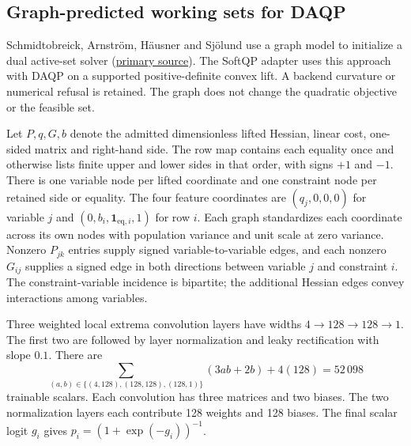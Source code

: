 \subsection{Graph-predicted working sets for DAQP}\label{sec:method-learned-daqp}
Schmidtobreick, Arnstr\"om, H\"ausner and Sj\"olund use a graph model
to initialize a dual active-set solver
(\href{https://arxiv.org/abs/2511.13174v2}{primary source}).
The SoftQP adapter uses this approach with DAQP \cite{daqp} on a
supported positive-definite convex lift. A backend curvature or
numerical refusal is retained. The graph does not change the quadratic
objective or the feasible set.

Let \(P,q,G,b\) denote the admitted dimensionless lifted Hessian,
linear cost, one-sided matrix and right-hand side. The row map
contains each equality once and otherwise lists finite upper and
lower sides in that order, with signs \(+1\) and \(-1\). There is
one variable node per lifted coordinate and one constraint node per
retained side or equality. The four feature coordinates are
\((q_j,0,0,0)\) for variable \(j\) and
\((0,b_i,\mathbf1_{\mathrm{eq},i},1)\) for row \(i\).
Each graph standardizes each coordinate across its own nodes with
population variance and unit scale at zero variance. Nonzero
\(P_{jk}\) entries supply signed variable-to-variable edges, and
each nonzero \(G_{ij}\) supplies a signed edge in both directions
between variable \(j\) and constraint \(i\). The constraint-variable
incidence is bipartite; the additional Hessian edges convey
interactions among variables.

Three weighted local extrema convolution layers have widths
\(4\to128\to128\to1\). The first two are followed by layer normalization
and leaky rectification with slope \(0.1\). There are
\begin{equation}\label{eq:learn-daqp-parameters}
 \sum_{(a,b)\in\{(4,128),(128,128),(128,1)\}}(3ab+2b)+4(128)
 =52\,098
\end{equation}
trainable scalars. Each convolution has three matrices and two
biases. The two normalization layers each contribute 128 weights
and 128 biases. The final scalar logit \(g_i\) gives
\(p_i=(1+\exp(-g_i))^{-1}\).

